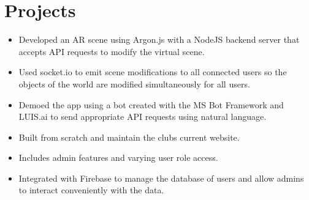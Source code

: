 \documentclass{resume}
\begin{document}
\begin{minipage}[t]{0.63\linewidth}
\section{Projects}
\begin{itemize}
    \item Developed an AR scene using Argon.js with a NodeJS backend server that accepts API requests to modify the virtual scene.
    \item Used socket.io to emit scene modifications to all connected users so the objects of the world are modified simultaneously for all users.
    \item Demoed the app using a bot created with the MS Bot Framework and LUIS.ai to send appropriate API requests using natural language.
\end{itemize}
\begin{itemize}
    \item Built from scratch and maintain the clubs current website.
    \item Includes admin features and varying user role access.
    \item Integrated with Firebase to manage the database of users and allow admins to interact conveniently with the data.
\end{itemize}

\end{minipage}
\end{document}
